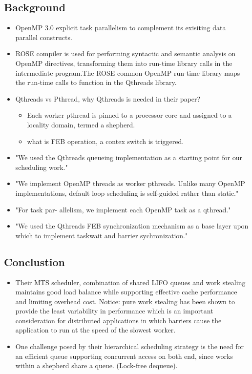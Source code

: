 \documentclass[11pt]{article}
\begin{document}
\subsection{Background}
\label{sec-4-3}
\begin{itemize}
\item OpenMP 3.0 explicit task parallelism to complement its exisiting data parallel constructs.
\item ROSE compiler is used for performing syntactic and semantic analysis on OpenMP directives, transforming them into run-time library calls in the intermediate program.The ROSE common OpenMP run-time library maps the run-time calls to function in the Qthreads library.
\item Qthreads vs Pthread, why Qthreads is needed in their paper?
\begin{itemize}
\item Each worker pthread is pinned to a processor core and assigned to a locality domain, termed a shepherd.
\item what is FEB operation, a contex switch is triggered.
\end{itemize}
\item "We used the Qthreads queueing implementation as a starting point for our scheduling work."
\item "We implement OpenMP threads as worker pthreads. Unlike many OpenMP implementations, default loop scheduling is self-guided rather than static."
\item "For task par- allelism, we implement each OpenMP task as a qthread."
\item "We used the Qthreads FEB synchronization mechanism as a base layer upon which to implement taskwait and barrier sychronization."
\end{itemize}

\subsection{Conclustion}
\label{sec-4-4}
\begin{itemize}
\item Their MTS scheduler, combination of shared LIFO queues and work stealing maintains good load balance while supporting effective cache performance and limiting overhead cost. Notice: pure work stealing has been shown to provide the least variability in performance which is an important consideration for distributed applications in which barriers cause the application to run at the speed of the slowest worker.
\item One challenge posed by their hierarchical scheduling strategy is the need for an efficient queue supporting concurrent access on both end, since works within a shepherd share a queue. (Lock-free dequeue).
\end{itemize}
\end{document}
